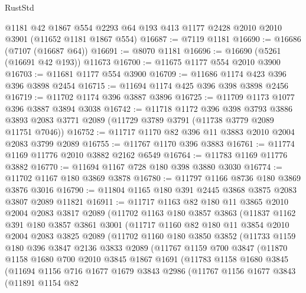 \begin{lexlean}{RustStd}
\begin{coremodule}
    @1181
    @42
    @1867
    @554
    @2293
    @64
    @193
    @413
    @1177
    @2428
    @2010
    @2010
    @3901
    (@11652 @1181 @1867 @554)
@16687 := @7119 @1181
@16690 := @16686 (@7107 (@16687 @64))
@16691 := @8070 @1181
@16696 := @16690 (@5261 (@16691 @42 @193)) @11673
@16700 := @11675 @1177 @554 @2010 @3900
@16703 := @11681 @1177 @554 @3900
@16709 := @11686 @1174 @423 @396 @396 @3898 @2454
@16715 := @11694 @1174 @425 @396 @398 @3898 @2456
@16719 := @11702 @1174 @396 @3887 @3896
@16725 := @11709 @1173 @1077 @396 @3887 @3894 @3038
@16742 := @11718
    @1172
    @396
    @398
    @3793
    @3886
    @3893
    @2083
    @3771
    @2089
    (@11729 @3789 @3791 (@11738 @3779 @2089 @11751 @7046))
@16752 := @11717 @1170 @82 @396 @11 @3883 @2010 @2004 @2083 @3799 @2089
@16755 := @11767 @1170 @396 @3883
@16761 := @11774 @1169 @11776 @2010 @3882 @2162 @6549
@16764 := @11783 @1169 @11776 @3882
@16770 := @11694 @1167 @728 @180 @398 @3880 @3030
@16774 := @11702 @1167 @180 @3869 @3878
@16780 := @11797 @1166 @8736 @180 @3869 @3876 @3016
@16790 := @11804 @1165 @180 @391 @2445 @3868 @3875 @2083 @3807 @2089 @11821
@16911 := @11717
    @1163
    @82
    @180
    @11
    @3865
    @2010
    @2004
    @2083
    @3817
    @2089
    (@11702
      @1163
      @180
      @3857
      @3863
      (@11837
        @1162
        @391
        @180
        @3857
        @3861
        @3001
        (@11717
          @1160
          @82
          @180
          @11
          @3854
          @2010
          @2004
          @2083
          @3825
          @2089
          (@11702
            @1160
            @180
            @3850
            @3852
            (@11733
              @1159
              @180
              @396
              @3847
              @2136
              @3833
              @2089
              (@11767
                @1159
                @700
                @3847
                (@11870
                  @1158
                  @1680
                  @700
                  @2010
                  @3845
                  @1867
                  @1691
                  (@11783
                    @1158
                    @1680
                    @3845
                    (@11694
                      @1156
                      @716
                      @1677
                      @1679
                      @3843
                      @2986
                      (@11767
                        @1156
                        @1677
                        @3843
                        (@11891
                          @1154
                          @82

\end{coremodule}
\end{lexlean}
